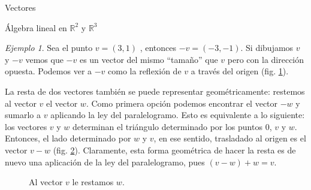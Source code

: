 \documentclass[a4paper,12pt,twoside,spanish,reqno]{amsbook}
\numberwithin{equation}{section}
\theoremstyle{definition}
\theoremstyle{remark}
\newtheorem*{ejemplo*}{Ejemplo}
\newcommand{\R}{\mathbb R}
\begin{document}
\begin{chapter}{Vectores}
\begin{section}{Álgebra lineal en $\R^2$ y $\R^3$}
    
    \begin{ejemplo*} Sea el punto $v =(3, 1)$ , entonces $-v = (- 3, - 1)$. Si dibujamos $v$ y $-v$ vemos que $-v$ es un vector del mismo ``tamaño'' que $v$ pero con la dirección opuesta. Podemos ver a $-v$ como la reflexión de $v$ a través del origen (fig. \ref{fig-vector-opuesto}). 
    \begin{figure}[h]
        \caption{\;}\label{fig-vector-opuesto}
    \end{figure}
    \end{ejemplo*}




    La resta de dos vectores también se puede representar geométricamente: restemos  al vector $v$ el vector $w$. Como primera opción podemos encontrar el  vector $-w$ y sumarlo  a $v$ aplicando la ley del paralelogramo. Esto es equivalente a lo siguiente: los vectores $v$ y $w$ determinan el triángulo determinado por los puntos $0$, $v$ y $w$. Entonces,  el lado determinado por $w$ y $v$,  en ese sentido, trasladado al origen es el vector $v-w$  (fig. \ref{fig-resta-de-vectores}). Claramente, esta forma geométrica de hacer la resta  es de nuevo una aplicación de la ley del paralelogramo, pues $(v-w)+ w= v$.
    \begin{figure}[h]
        \caption{Al  vector $v$ le restamos $w$.}\label{fig-resta-de-vectores}
    \end{figure}
    

\end{section}
\end{chapter}
\end{document}
